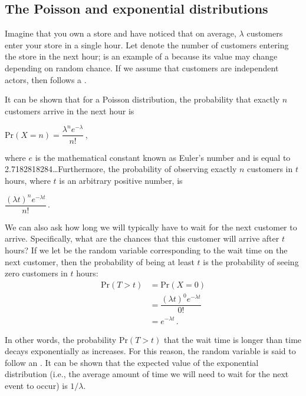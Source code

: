 \FloatBarrier
{}
\subsection{The Poisson and exponential distributions}

Imagine that you own a store and have noticed that on average, $\lambda$ customers enter your store in a single hour. Let  denote the number of customers entering the store in the next hour;  is an example of a  because its value may change depending on random chance. If we assume that customers are independent actors, then  follows a .

It can be shown that for a Poisson distribution, the probability that exactly $n$ customers arrive in the next hour is

\begin{center}
$\mathrm{Pr}(X = n) = \dfrac{\lambda^n e^{-\lambda}}{n!}$\,,
\end{center}

\noindent where $e$ is the mathematical constant known as Euler's number and is equal to 2.7182818284\ldots Furthermore, the probability of observing exactly $n$ customers in $t$ hours, where $t$ is an arbitrary positive number, is

\begin{center}
$\dfrac{(\lambda t)^n e^{-\lambda t}}{n!}$\,.
\end{center}

We can also ask how long we will typically have to wait for the next customer to arrive. Specifically, what are the chances that this customer will arrive after $t$ hours? If we let  be the random variable corresponding to the wait time on the next customer, then the probability of  being at least $t$ is the probability of seeing zero customers in $t$ hours:
\begin{align*}
\mathrm{Pr}(T > t) &= \mathrm{Pr}(X = 0)\\
& = \dfrac{(\lambda t)^0 e^{-\lambda t}}{0!}\\
& = e^{-\lambda t}\,.
\end{align*}

In other words, the probability $\mathrm{Pr}(T > t)$ that the wait time is longer than time  decays exponentially as  increases. For this reason, the random variable  is said to follow an . It can be shown that the expected value of the exponential distribution (i.e., the average amount of time we will need to wait for the next event to occur) is $1/\lambda$.\\

